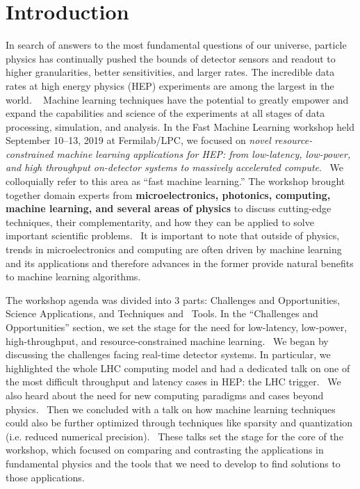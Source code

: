 \documentclass[11pt,letterpaper,fleqn]{article}
\begin{document}

\newpage
\pagestyle{reststyle}

\section{Introduction}

In search of answers to the most fundamental questions of our universe, particle physics has continually pushed the bounds of detector sensors and readout to higher granularities, better sensitivities, and larger rates. The incredible data rates at high energy physics (HEP) experiments are among the largest in the world.  
Machine learning techniques have the potential to greatly empower and expand the capabilities and science of the experiments at all stages of data processing, simulation, and analysis.
In the Fast Machine Learning workshop held September 10--13, 2019 at Fermilab/LPC, we focused on  {\it novel resource-constrained machine learning applications for HEP: from low-latency, low-power, and high throughput on-detector systems to massively accelerated compute}.  We colloquially refer to this area as ``fast machine learning.'' The workshop brought together domain experts from {\bf microelectronics, photonics, computing, machine learning, and several areas of physics} to discuss cutting-edge techniques, their complementarity, and how they can be applied to solve important scientific problems.  It is important to note that outside of physics, trends in microelectronics and computing are often driven by machine learning and its applications and therefore advances in the former provide natural benefits to machine learning algorithms.

The workshop agenda was divided into 3 parts: Challenges and Opportunities, Science Applications, and Techniques and  Tools.
In the ``Challenges and Opportunities'' section, we set the stage for the need for low-latency, low-power, high-throughput, and resource-constrained machine learning.  We began by discussing the challenges facing real-time detector systems. In particular, we highlighted the whole LHC computing model and had a dedicated talk on one of the most difficult throughput and latency cases in HEP: the LHC trigger.  We also heard about the need for new computing paradigms and cases beyond physics.  Then we concluded with a talk on how machine learning techniques could also be further optimized through techniques like sparsity and quantization (i.e. reduced numerical precision).  These talks set the stage for the core of the workshop, which focused on comparing and contrasting the applications in fundamental physics and the tools that we need to develop to find solutions to those applications.  
\end{document}
